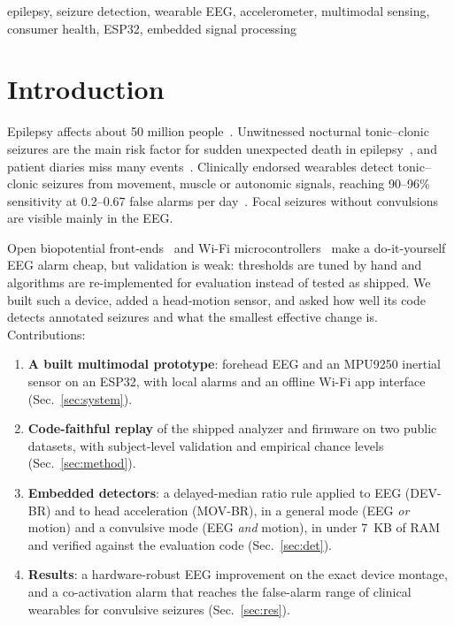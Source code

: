 \documentclass[conference,letterpaper]{IEEEtran}
\begin{document}
\begin{IEEEkeywords}
epilepsy, seizure detection, wearable EEG, accelerometer, multimodal sensing, consumer health, ESP32, embedded signal processing
\end{IEEEkeywords}

\section{Introduction}
Epilepsy affects about 50 million people~\cite{who2024epilepsy}. Unwitnessed nocturnal tonic--clonic seizures are the main risk factor for sudden unexpected death in epilepsy~\cite{devinsky2016sudep}, and patient diaries miss many events~\cite{elger2018underreporting}. Clinically endorsed wearables detect tonic--clonic seizures from movement, muscle or autonomic signals, reaching 90--96\% sensitivity at 0.2--0.67 false alarms per day~\cite{beniczky2021guideline,beniczky2013acc,onorati2017embrace}. Focal seizures without convulsions are visible mainly in the EEG.

Open biopotential front-ends~\cite{bioamp} and Wi-Fi microcontrollers~\cite{esp32} make a do-it-yourself EEG alarm cheap, but validation is weak: thresholds are tuned by hand and algorithms are re-implemented for evaluation instead of tested as shipped. We built such a device, added a head-motion sensor, and asked how well its code detects annotated seizures and what the smallest effective change is. Contributions:
\begin{enumerate}
\item \textbf{A built multimodal prototype}: forehead EEG and an MPU9250 inertial sensor on an ESP32, with local alarms and an offline Wi-Fi app interface (Sec.~\ref{sec:system}).
\item \textbf{Code-faithful replay} of the shipped analyzer and firmware on two public datasets, with subject-level validation and empirical chance levels (Sec.~\ref{sec:method}).
\item \textbf{Embedded detectors}: a delayed-median ratio rule applied to EEG (DEV-BR) and to head acceleration (MOV-BR), in a general mode (EEG \emph{or} motion) and a convulsive mode (EEG \emph{and} motion), in under 7~KB of RAM and verified against the evaluation code (Sec.~\ref{sec:det}).
\item \textbf{Results}: a hardware-robust EEG improvement on the exact device montage, and a co-activation alarm that reaches the false-alarm range of clinical wearables for convulsive seizures (Sec.~\ref{sec:res}).
\end{enumerate}
\end{document}
